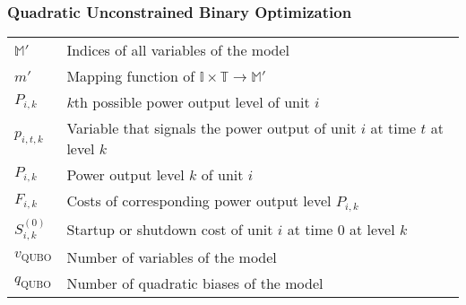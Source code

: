 \subsubsection{Quadratic Unconstrained Binary Optimization}

\begin{tabular}{ll}
  $\mathbb{M}'$ & Indices of all variables of the model \\
  $m'$ & Mapping function of $\mathbb{I} \times \mathbb{T} \to \mathbb{M}'$ \\
  $P_{i, k}$ & $k$th possible power output level of unit $i$ \\
  $p_{i, t, k}$ & Variable that signals the power output of unit $i$ at time $t$ at level $k$ \\
  $P_{i, k}$ & Power output level $k$ of unit $i$ \\
  $F_{i, k}$ & Costs of corresponding power output level $P_{i, k}$ \\
  $S_{i, k}^{(0)}$ & Startup or shutdown cost of unit $i$ at time $0$ at level $k$ \\
  $v_{\text{QUBO}}$ & Number of variables of the model \\
  $q_{\text{QUBO}}$ & Number of quadratic biases of the model
\end{tabular}
